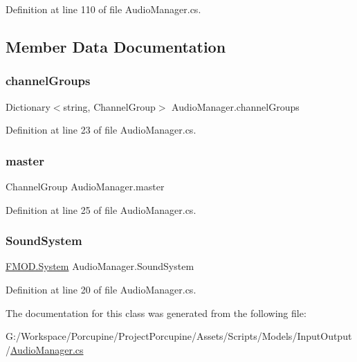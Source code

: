 Definition at line 110 of file Audio\+Manager.\+cs.



\subsection{Member Data Documentation}
\mbox{\label{class_audio_manager_a244e34ddca536d06f27f229d9bf5a892}} 
\subsubsection{\texorpdfstring{channel\+Groups}{channelGroups}}
{\footnotesize\ttfamily Dictionary$<$string, Channel\+Group$>$ Audio\+Manager.\+channel\+Groups\hspace{0.3cm}{\ttfamily [static]}}



Definition at line 23 of file Audio\+Manager.\+cs.

\mbox{\label{class_audio_manager_ad10f0724af4436d127f862f949b6f613}} 
\subsubsection{\texorpdfstring{master}{master}}
{\footnotesize\ttfamily Channel\+Group Audio\+Manager.\+master\hspace{0.3cm}{\ttfamily [static]}}



Definition at line 25 of file Audio\+Manager.\+cs.

\mbox{\label{class_audio_manager_ad814b36aaed870a96339bcc8fb97e742}} 
\subsubsection{\texorpdfstring{Sound\+System}{SoundSystem}}
{\footnotesize\ttfamily \hyperlink{_simple_priority_queue_8cs_a81a223a02c34d82b47199f08308847f2}{F\+M\+O\+D.\+System} Audio\+Manager.\+Sound\+System\hspace{0.3cm}{\ttfamily [static]}}



Definition at line 20 of file Audio\+Manager.\+cs.



The documentation for this class was generated from the following file\+:\begin{DoxyCompactItemize}
\item 
G\+:/\+Workspace/\+Porcupine/\+Project\+Porcupine/\+Assets/\+Scripts/\+Models/\+Input\+Output/\hyperlink{_audio_manager_8cs}{Audio\+Manager.\+cs}\end{DoxyCompactItemize}
